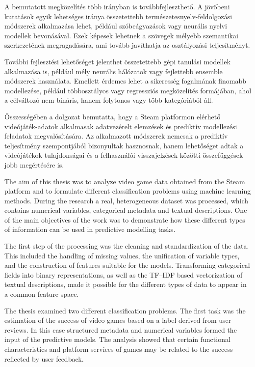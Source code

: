 A bemutatott megközelítés több irányban is továbbfejleszthető.
A jövőbeni kutatások egyik lehetséges iránya
összetettebb természetesnyelv-feldolgozási módszerek alkalmazása lehet,
például szóbeágyazások vagy neurális nyelvi modellek bevonásával.
Ezek képesek lehetnek a szövegek mélyebb szemantikai szerkezetének
megragadására, ami tovább javíthatja az osztályozási teljesítményt.

További fejlesztési lehetőséget jelenthet
összetettebb gépi tanulási modellek alkalmazása is,
például mély neurális hálózatok vagy fejlettebb ensemble módszerek használata.
Emellett érdemes lehet a sikeresség fogalmának finomabb modellezése,
például többosztályos vagy regressziós megközelítés formájában,
ahol a célváltozó nem bináris,
hanem folytonos vagy több kategóriából áll.

Összességében a dolgozat bemutatta,
hogy a Steam platformon elérhető videójáték-adatok
alkalmasak adatvezérelt elemzések és prediktív modellezési feladatok
megvalósítására.
Az alkalmazott módszerek nemcsak a prediktív teljesítmény szempontjából
bizonyultak hasznosnak,
hanem lehetőséget adtak a videójátékok tulajdonságai
és a felhasználói visszajelzések közötti összefüggések
jobb megértésére is.


The aim of this thesis was to analyze video game data obtained from the Steam \cite{steam} platform and to formulate different classification problems using machine learning methods.
During the research a real, heterogeneous dataset was processed, which contains numerical variables, categorical metadata and textual descriptions.
One of the main objectives of the work was to demonstrate how these different types of information can be used in predictive modelling tasks.

The first step of the processing was the cleaning and standardization of the data.
This included the handling of missing values, the unification of variable types,
and the construction of features suitable for the models.
Transforming categorical fields into binary representations,
as well as the TF--IDF based vectorization of textual descriptions,
made it possible for the different types of data to appear in a common feature space.

The thesis examined two different classification problems.
The first task was the estimation of the success of video games
based on a label derived from user reviews.
In this case structured metadata and numerical variables formed the input of the predictive models.
The analysis showed that certain functional characteristics and platform services of games
may be related to the success reflected by user feedback.

